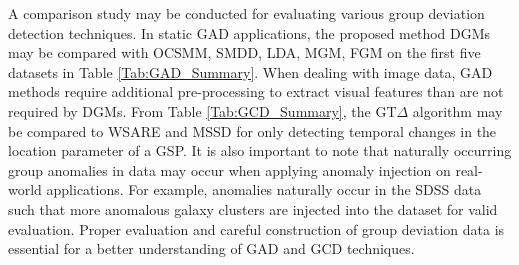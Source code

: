  
 A comparison study may be conducted for evaluating various group deviation detection techniques. In static GAD applications, the proposed method DGMs may be compared with OCSMM,  SMDD, LDA, MGM, FGM on the first five datasets in Table \ref{Tab:GAD_Summary}. When dealing with image data, GAD methods require additional pre-processing to extract visual features than are not required by DGMs. From Table \ref{Tab:GCD_Summary}, the GT$\Delta$ algorithm may be compared to WSARE and MSSD for only detecting temporal changes in the location parameter of a GSP. 
 It is also important to note that naturally occurring group anomalies in data may occur when applying anomaly injection on real-world applications. For example, anomalies naturally occur in the SDSS data such that more anomalous galaxy clusters are injected into the dataset for valid evaluation. Proper evaluation and careful construction of group deviation data is essential for a better understanding of GAD and GCD techniques.  
